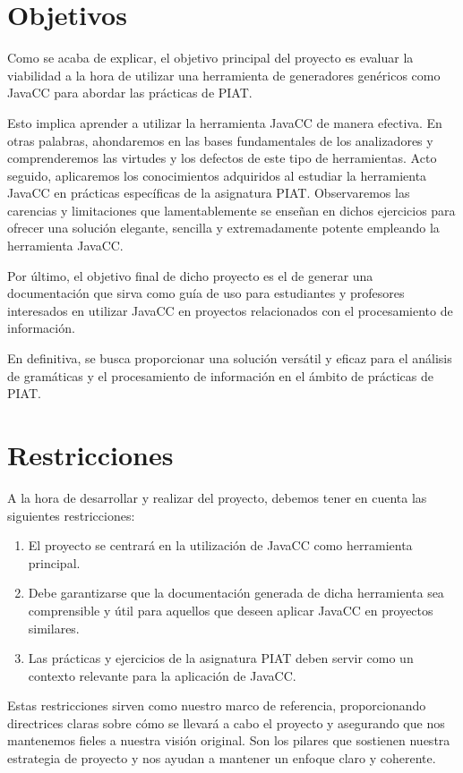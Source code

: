\section{Objetivos}

Como se acaba de explicar, el objetivo principal del proyecto es evaluar la viabilidad a la hora de utilizar una herramienta de generadores genéricos como JavaCC para abordar las prácticas de PIAT. 

Esto implica aprender a utilizar la herramienta JavaCC de manera efectiva. En otras palabras, ahondaremos en las bases fundamentales de los analizadores y comprenderemos las virtudes y los defectos de este tipo de herramientas. Acto seguido, aplicaremos los conocimientos adquiridos al estudiar la herramienta JavaCC en prácticas específicas de la asignatura PIAT. Observaremos las carencias y limitaciones que lamentablemente se enseñan en dichos ejercicios para ofrecer una solución elegante, sencilla y extremadamente potente empleando la herramienta JavaCC.


Por último, el objetivo final de dicho proyecto es el de generar una documentación que sirva como guía de uso para estudiantes y profesores interesados en utilizar JavaCC en proyectos relacionados con el procesamiento de información. 

En definitiva, se busca proporcionar una solución versátil y eficaz para el análisis de gramáticas y el procesamiento de información en el ámbito de prácticas de PIAT.

\section{Restricciones}
	A la hora de desarrollar y realizar del proyecto, debemos tener en cuenta las siguientes restricciones:
\begin{enumerate}
    \item El proyecto se centrará en la utilización de JavaCC como herramienta principal. 
    \item Debe garantizarse que la documentación generada de dicha herramienta sea comprensible y útil para aquellos que deseen aplicar JavaCC en proyectos similares.
    \item Las prácticas y ejercicios de la asignatura PIAT deben servir como un contexto relevante para la aplicación de JavaCC.
\end{enumerate}

Estas restricciones sirven como nuestro marco de referencia, proporcionando directrices claras sobre cómo se llevará a cabo el proyecto y asegurando que nos mantenemos fieles a nuestra visión original. Son los pilares que sostienen nuestra estrategia de proyecto y nos ayudan a mantener un enfoque claro y coherente.

